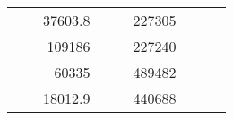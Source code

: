 \begin{table}[H]
\begin{tabular}{|ccrccrccc}
\multicolumn{1}{|c|}{\cellcolor[HTML]{FFFFC7}}                                & \multicolumn{1}{c|}{\cellcolor[HTML]{DAE8FC}}                      & \multicolumn{1}{r|}{\cellcolor[HTML]{DAE8FC}37603.8}   & \multicolumn{1}{c|}{\cellcolor[HTML]{FFFFC7}}                                & \multicolumn{1}{c|}{\cellcolor[HTML]{DAE8FC}}                       & \multicolumn{1}{r|}{\cellcolor[HTML]{DDFDFF}227305}    &                                                                              &                                                                    &                                                        \\ \cline{3-3} \cline{6-6}
\multicolumn{1}{|c|}{\cellcolor[HTML]{FFFFC7}}                                & \multicolumn{1}{c|}{\cellcolor[HTML]{DAE8FC}}                      & \multicolumn{1}{r|}{\cellcolor[HTML]{DDFDFF}109186}    & \multicolumn{1}{c|}{\cellcolor[HTML]{FFFFC7}}                                & \multicolumn{1}{c|}{\cellcolor[HTML]{DAE8FC}}                       & \multicolumn{1}{r|}{\cellcolor[HTML]{DAE8FC}227240}    &                                                                              &                                                                    &                                                        \\ \cline{3-3} \cline{6-6}
\multicolumn{1}{|c|}{\cellcolor[HTML]{FFFFC7}}                                & \multicolumn{1}{c|}{\cellcolor[HTML]{DAE8FC}}                      & \multicolumn{1}{r|}{\cellcolor[HTML]{DAE8FC}60335}     & \multicolumn{1}{c|}{\cellcolor[HTML]{FFFFC7}}                                & \multicolumn{1}{c|}{\cellcolor[HTML]{DAE8FC}}                       & \multicolumn{1}{r|}{\cellcolor[HTML]{DDFDFF}489482}    &                                                                              &                                                                    &                                                        \\ \cline{3-3} \cline{6-6}
\multicolumn{1}{|c|}{\cellcolor[HTML]{FFFFC7}}                                & \multicolumn{1}{c|}{\cellcolor[HTML]{DAE8FC}}                      & \multicolumn{1}{r|}{\cellcolor[HTML]{DDFDFF}18012.9}   & \multicolumn{1}{c|}{\cellcolor[HTML]{FFFFC7}}                                & \multicolumn{1}{c|}{\cellcolor[HTML]{DAE8FC}}                       & \multicolumn{1}{r|}{\cellcolor[HTML]{DAE8FC}440688}    &                                                                              &                                                                    &                                                        \\ \cline{3-3} \cline{6-6}

\end{tabular}
\end{table}
